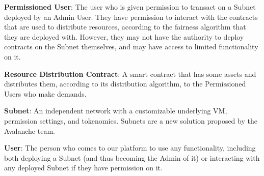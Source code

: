 \documentclass[a4paper,12pt]{report}
\begin{document}
\textbf{Permissioned User}: The user who is given permission to transact on a Subnet deployed by an Admin User. They have permission to interact with the contracts that are used to distribute resources, according to the fairness algorithm that they are deployed with. However, they may not have the authority to deploy contracts on the Subnet themselves, and may have access to limited functionality on it.

\textbf{Resource Distribution Contract}: A smart contract that has some assets and distributes them, according to its distribution algorithm, to the Permissioned Users who make demands.

\textbf{Subnet}: An independent network with a customizable underlying VM, permission settings, and tokenomics. Subnets are a new solution proposed by the Avalanche team. 

\textbf{User}: The person who comes to our platform to use any functionality, including both deploying a Subnet (and thus becoming the Admin of it) or interacting with any deployed Subnet if they have permission on it.
\end{document}
